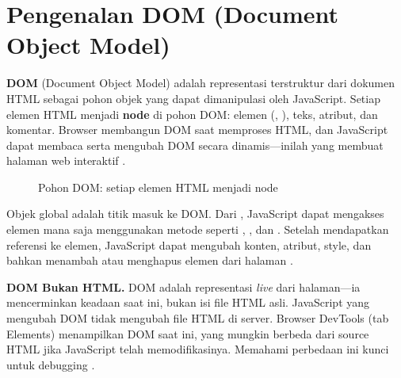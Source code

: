 ﻿\section{Pengenalan DOM (Document Object Model)}

\textbf{DOM} (Document Object Model) adalah representasi terstruktur dari dokumen HTML sebagai pohon objek yang dapat dimanipulasi oleh JavaScript. Setiap elemen HTML menjadi \textbf{node} di pohon DOM: elemen (, ), teks, atribut, dan komentar. Browser membangun DOM saat memproses HTML, dan JavaScript dapat membaca serta mengubah DOM secara dinamis---inilah yang membuat halaman web interaktif \cite{mdnJsGuide}.

\begin{figure}[H]
\centering
{}
\caption{Pohon DOM: setiap elemen HTML menjadi node}
\end{figure}

Objek global  adalah titik masuk ke DOM. Dari , JavaScript dapat mengakses elemen mana saja menggunakan metode seperti , , dan . Setelah mendapatkan referensi ke elemen, JavaScript dapat mengubah konten, atribut, style, dan bahkan menambah atau menghapus elemen dari halaman \cite{jsInfo}.

\begin{konsep}
\textbf{DOM Bukan HTML.} DOM adalah representasi \textit{live} dari halaman---ia mencerminkan keadaan saat ini, bukan isi file HTML asli. JavaScript yang mengubah DOM tidak mengubah file HTML di server. Browser DevTools (tab Elements) menampilkan DOM saat ini, yang mungkin berbeda dari source HTML jika JavaScript telah memodifikasinya. Memahami perbedaan ini kunci untuk debugging \cite{mdnJsGuide}.
\end{konsep}

